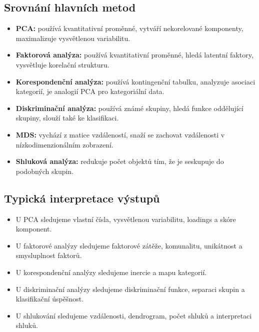 \subsection{Srovnání hlavních metod}

\begin{itemize}
    \item \textbf{PCA:}
    používá kvantitativní proměnné, vytváří nekorelované komponenty, maximalizuje vysvětlenou
    variabilitu.
    
    \item \textbf{Faktorová analýza:}
    používá kvantitativní proměnné, hledá latentní faktory, vysvětluje korelační strukturu.
    
    \item \textbf{Korespondenční analýza:}
    používá kontingenční tabulku, analyzuje asociaci kategorií, je analogií PCA pro kategoriální data.
    
    \item \textbf{Diskriminační analýza:}
    používá známé skupiny, hledá funkce oddělující skupiny, slouží také ke klasifikaci.
    
    \item \textbf{MDS:}
    vychází z matice vzdáleností, snaží se zachovat vzdálenosti v nízkodimenzionálním zobrazení.
    
    \item \textbf{Shluková analýza:}
    redukuje počet objektů tím, že je seskupuje do podobných skupin.
\end{itemize}

\subsection{Typická interpretace výstupů}

\begin{itemize}
    \item U PCA sledujeme vlastní čísla, vysvětlenou variabilitu, loadings a skóre komponent.
    \item U faktorové analýzy sledujeme faktorové zátěže, komunalitu, unikátnost a smysluplnost faktorů.
    \item U korespondenční analýzy sledujeme inercie a mapu kategorií.
    \item U diskriminační analýzy sledujeme diskriminační funkce, separaci skupin a klasifikační úspěšnost.
    \item U shlukování sledujeme vzdálenosti, dendrogram, počet shluků a interpretaci shluků.
\end{itemize}

